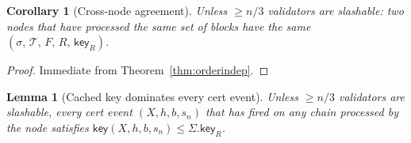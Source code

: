\ifx\litemode\undefined\documentclass{article}\fi
\newcommand{\T}[0]{\ensuremath{\mathcal{T}}}
\newcommand{\key}{\mathsf{key}}
\theoremstyle{plain}
\newtheorem{corollary}{Corollary}
\newtheorem{lemma}{Lemma}
\theoremstyle{definition}
\theoremstyle{remark}
\begin{document}
\begin{corollary}[Cross-node agreement]\label{cor:agreement}
Unless $\geq n/3$ validators are slashable: two nodes that have processed the same set of blocks have the same $(\sigma,\, \T,\, F,\, R,\, \key_R)$.
\end{corollary}

\begin{proof}
Immediate from Theorem~\ref{thm:orderindep}.
\end{proof}

\begin{lemma}[Cached key dominates every cert event]\label{rev:lem:Rs-key-dominates}
Unless $\geq n/3$ validators are slashable, every cert event $(X, h, b, s_n)$ that has fired on any chain processed by the node satisfies $\key(X, h, b, s_n) \leq \Sigma.\key_R$.
\end{lemma}
\end{document}
